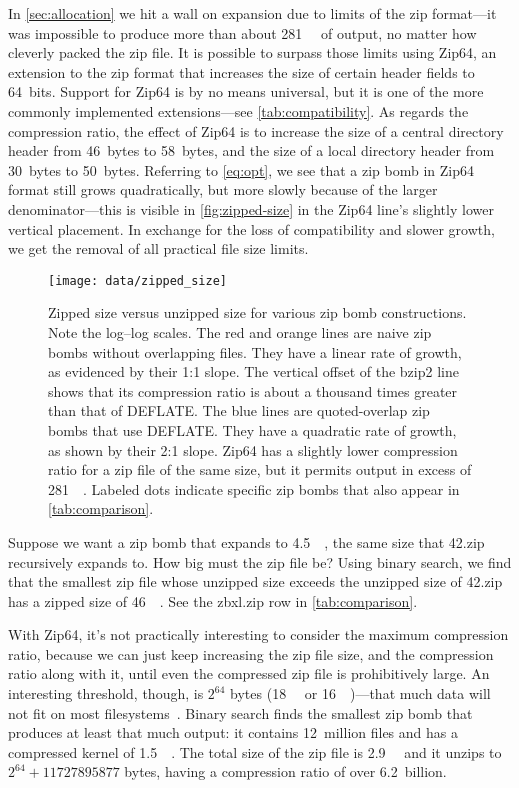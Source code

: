 \documentclass[letterpaper,twocolumn,10pt]{article}
\newcommand{\MB}{\mega\byte}
\newcommand{\GB}{\giga\byte}
\newcommand{\TB}{\tera\byte}
\newcommand{\PB}{\peta\byte}
\newcommand{\EB}{\exa\byte}
\newcommand{\EiB}{\exbi\byte}
\begin{document}
In \autoref{sec:allocation} we hit a wall on expansion
due to limits of the zip format---it was impossible
to produce more than about \SI{281}{\TB} of output,
no matter how cleverly packed the zip file.
It is possible to surpass those limits
using Zip64, an extension to the zip format that increases
the size of certain header fields to 64~bits.
Support for Zip64 is by no means universal,
but it is one of the more commonly implemented extensions---see \autoref{tab:compatibility}.
As regards the compression ratio,
the effect of Zip64 is to
increase the size of a central directory header from
\SI{46}{bytes} to \SI{58}{bytes},
and the size of a local directory header from
\SI{30}{bytes} to \SI{50}{bytes}.
Referring to \autoref{eq:opt},
we see that a zip bomb in Zip64 format
still grows quadratically,
but more slowly because of the larger denominator---this
is visible in \autoref{fig:zipped-size} in the Zip64 line's
slightly lower vertical placement.
In exchange for the loss of compatibility
and slower growth,
we get the removal of all practical file size limits.

\begin{figure}
\texttt{[image: data/zipped\_size]}
\caption{
Zipped size versus unzipped size for various zip bomb constructions.
Note the log--log scales.
The red and orange lines are naive zip bombs without overlapping files.
They have a linear rate of growth,
as evidenced by their 1:1 slope.
The vertical offset of the bzip2 line shows that its compression ratio
is about a thousand times greater than that of DEFLATE.
The blue lines are quoted-overlap zip bombs that use DEFLATE.
They have a quadratic rate of growth,
as shown by their 2:1 slope.
Zip64 has a slightly lower compression ratio
for a zip file of the same size,
but it permits output in excess of \SI{281}{\TB}.
Labeled dots indicate specific zip bombs that
also appear in \autoref{tab:comparison}.
}
\label{fig:zipped-size}
\end{figure}

Suppose we want a zip bomb that expands to \SI{4.5}{\PB},
the same size that 42.zip recursively expands to.
How big must the zip file be?
Using binary search, we find that the smallest
zip file whose unzipped size exceeds the unzipped size of 42.zip
has a zipped size of \SI{46}{\MB}.
See the \mbox{zbxl.zip} row in \autoref{tab:comparison}.

With Zip64, it's not practically interesting to
consider the maximum compression ratio,
because we can just keep increasing the zip file size,
and the compression ratio along with it,
until even the compressed zip file is prohibitively large.
An interesting threshold, though,
is $2^{64}$ bytes
(\SI{18}{\EB} or \SI{16}{\EiB})---that
much data will not fit on most filesystems~\cite[\S Limits]{wiki-fs}.
Binary search finds the smallest zip bomb that produces at least that much output:
it contains 12~million files and has a compressed kernel of \SI{1.5}{\GB}.
The total size of the zip file is \SI{2.9}{\GB} and it unzips
to $2^{64}+\num{11727895877}$ bytes,
having a compression ratio of over 6.2~billion.
\end{document}
